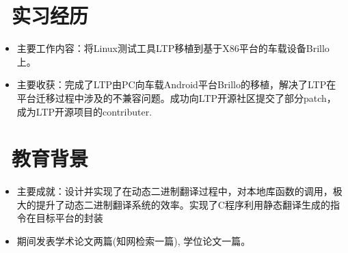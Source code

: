 \documentclass{resume}
\begin{document}

\section{\faUsers\ 实习经历}\normalsize
{}
\begin{itemize}
  \item {主要工作内容：将Linux测试工具LTP移植到基于X86平台的车载设备Brillo上。}
    \item {主要收获：完成了LTP由PC向车载Android平台Brillo的移植，解决了LTP在平台迁移过程中涉及的不兼容问题。成功向LTP开源社区提交了部分patch，成为LTP开源项目的contributer.}
\end{itemize}

\section{\faGraduationCap\  教育背景}\normalsize
{}
\begin{itemize}
\item {主要成就：设计并实现了在动态二进制翻译过程中，对本地库函数的调用，极大的提升了动态二进制翻译系统的效率。实现了C程序利用静态翻译生成的指令在目标平台的封装}
  \item {期间发表学术论文两篇(知网检索一篇), 学位论文一篇。}
\end{itemize}

\end{document}
